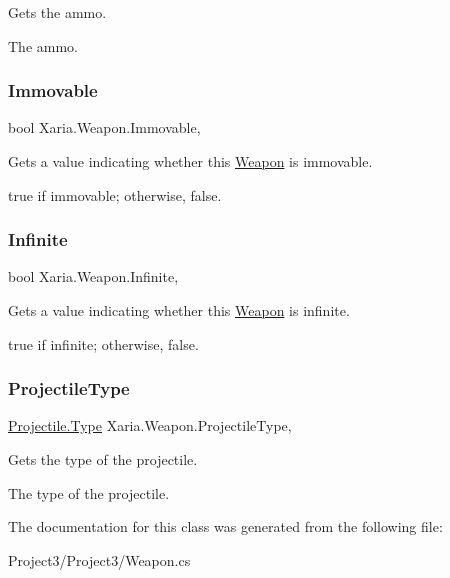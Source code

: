Gets the ammo. 

The ammo. \mbox{\label{classXaria_1_1Weapon_acd1e242b2456cf076c580dba2137fbd9}} 
\subsubsection{\texorpdfstring{Immovable}{Immovable}}
{\footnotesize\ttfamily bool Xaria.\+Weapon.\+Immovable\hspace{0.3cm}{\ttfamily [get]}, {}}



Gets a value indicating whether this \hyperlink{classXaria_1_1Weapon}{Weapon} is immovable. 

{\ttfamily true} if immovable; otherwise, {\ttfamily false}. \mbox{\label{classXaria_1_1Weapon_a2bcadab6d4981b28dcd81e2971c2f692}} 
\subsubsection{\texorpdfstring{Infinite}{Infinite}}
{\footnotesize\ttfamily bool Xaria.\+Weapon.\+Infinite\hspace{0.3cm}{\ttfamily [get]}, {}}



Gets a value indicating whether this \hyperlink{classXaria_1_1Weapon}{Weapon} is infinite. 

{\ttfamily true} if infinite; otherwise, {\ttfamily false}. \mbox{\label{classXaria_1_1Weapon_af1e4e7a9323d47a63a264f2c18acb07b}} 
\subsubsection{\texorpdfstring{Projectile\+Type}{ProjectileType}}
{\footnotesize\ttfamily \hyperlink{classXaria_1_1Projectile_a2f223d18f3b68ae549d974125826b78d}{Projectile.\+Type} Xaria.\+Weapon.\+Projectile\+Type\hspace{0.3cm}{\ttfamily [get]}, {}}



Gets the type of the projectile. 

The type of the projectile. 

The documentation for this class was generated from the following file\+:\begin{DoxyCompactItemize}
\item 
Project3/\+Project3/Weapon.\+cs\end{DoxyCompactItemize}
